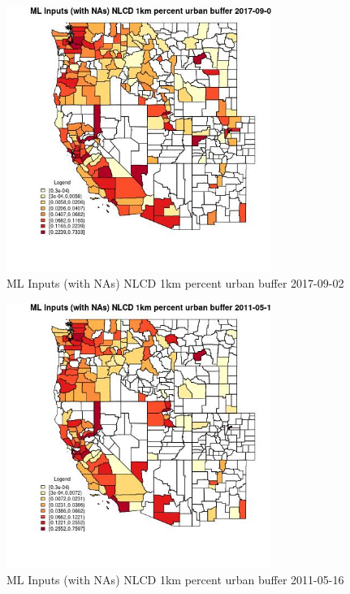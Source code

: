 \begin{figure} 
\centering  
\includegraphics[width=0.77\textwidth]{Code_Outputs/Report_ML_input_PM25_Step4_part_e_de_duplicated_aves_compiled_2019-05-21wNAs_CountyNLCD_1km_percent_urban_bufferMean2017-09-02.jpg} 
\caption{\label{fig:Report_ML_input_PM25_Step4_part_e_de_duplicated_aves_compiled_2019-05-21wNAsCountyNLCD_1km_percent_urban_bufferMean2017-09-02}ML Inputs (with NAs) NLCD 1km percent urban buffer 2017-09-02} 
\end{figure} 
 

\begin{figure} 
\centering  
\includegraphics[width=0.77\textwidth]{Code_Outputs/Report_ML_input_PM25_Step4_part_e_de_duplicated_aves_compiled_2019-05-21wNAs_CountyNLCD_1km_percent_urban_bufferMean2011-05-16.jpg} 
\caption{\label{fig:Report_ML_input_PM25_Step4_part_e_de_duplicated_aves_compiled_2019-05-21wNAsCountyNLCD_1km_percent_urban_bufferMean2011-05-16}ML Inputs (with NAs) NLCD 1km percent urban buffer 2011-05-16} 
\end{figure} 
 

